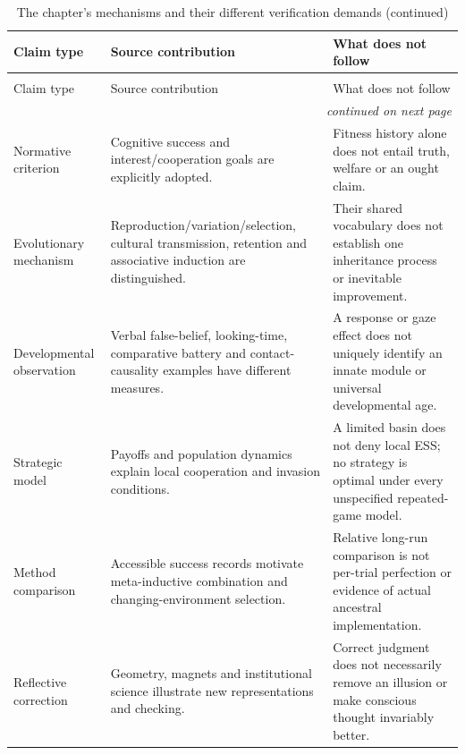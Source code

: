 \begin{longtable}{@{}p{.21\linewidth}p{.33\linewidth}p{.38\linewidth}@{}}
\caption{The chapter's mechanisms and their different verification demands.}
\label{tab:p19-r13-evidence-boundaries}\\
\toprule Claim type & Source contribution & What does not follow \\
\midrule\endfirsthead
\caption[]{The chapter's mechanisms and their different verification demands (continued)}\\
\toprule Claim type & Source contribution & What does not follow \\
\midrule\endhead
\midrule\multicolumn{3}{r}{\emph{continued on next page}}\\
\endfoot
\endlastfoot
Normative criterion & Cognitive success and interest/cooperation goals are explicitly adopted. & Fitness history alone does not entail truth, welfare or an ought claim. \\
Evolutionary mechanism & Reproduction/variation/selection, cultural transmission, retention and associative induction are distinguished. & Their shared vocabulary does not establish one inheritance process or inevitable improvement. \\
Developmental observation & Verbal false-belief, looking-time, comparative battery and contact-causality examples have different measures. & A response or gaze effect does not uniquely identify an innate module or universal developmental age. \\
Strategic model & Payoffs and population dynamics explain local cooperation and invasion conditions. & A limited basin does not deny local ESS; no strategy is optimal under every unspecified repeated-game model. \\
Method comparison & Accessible success records motivate meta-inductive combination and changing-environment selection. & Relative long-run comparison is not per-trial perfection or evidence of actual ancestral implementation. \\
Reflective correction & Geometry, magnets and institutional science illustrate new representations and checking. & Correct judgment does not necessarily remove an illusion or make conscious thought invariably better. \\
\bottomrule\end{longtable}

